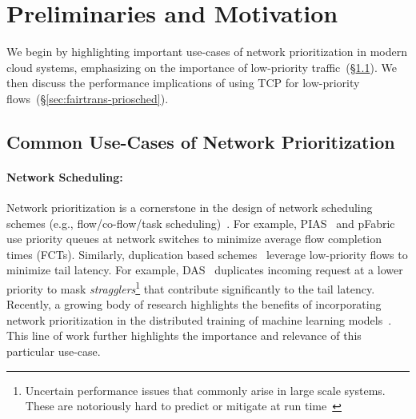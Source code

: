 \section{Preliminaries and Motivation}
\label{sec:motive}

We begin by highlighting important use-cases of network prioritization in modern cloud systems, emphasizing on the importance of low-priority traffic~(\S\ref{sec:priority-sched}).
We then discuss the performance implications of using TCP for low-priority flows~(\S\ref{sec:fairtrans-priosched}).

\subsection{Common Use-Cases of Network Prioritization}
\label{sec:priority-sched}
    
\paragraph{\textbf{Network Scheduling:}}
    Network prioritization is a cornerstone in the design of network scheduling schemes (e.g., flow/co-flow/task scheduling)~\cite{baraat,d3,pdq,das,pase,pias,pfabric,d2tcp}.
    For example, PIAS~\cite{pias} and pFabric~\cite{pfabric} use priority queues at network switches to minimize average flow completion times (FCTs). Similarly, duplication based schemes~\cite{das,primary-first,low-latency} leverage low-priority flows to minimize tail latency.
    For example, DAS~\cite{das} duplicates incoming request at a lower priority to mask \emph{stragglers}\footnote{Uncertain performance issues that commonly arise in large scale systems. These are notoriously hard to predict or mitigate at run time~\cite{ledge}} that contribute significantly to the tail latency. 
    Recently, a growing body of research highlights the benefits of incorporating network prioritization in the distributed training of machine learning models~\cite{p3,tictac,ccml-hotnets,bytesched}. This line of work further highlights the importance and relevance of this particular use-case. 

